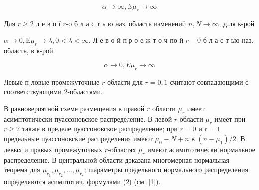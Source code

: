 \documentclass[10pt]{article}
\begin{document}
\[

\alpha \rightarrow \infty, E \mu_{r} \rightarrow \infty

\]



Для $r \geqslant 2$ л е в о ї $r$-о б л а с т ь ю наз. область изменений $n, N \rightarrow \infty$, д.ля к-рой



$\alpha \longrightarrow 0, \mathrm{E} \mu_{r} \longrightarrow \lambda, 0<\lambda<\infty$. Л е в о й п р о е ж т о ч по й $r-0$ б л а с т ью наз. область, в к-рой



\[

\alpha \longrightarrow 0, E \mu_{r} \longrightarrow \infty

\]



Левые п лөвые промежуточные $r$-области для $r=0,1$ считают совпадающими с соответствующими 2-областями.



В равновероятной схеме размещения в правой $r$ области $\mu_{r}$ имеет асимптотически пуассоновское распределение. В левой $r$-области $\mu_{r}$ имеет при $r \geqslant 2$ также в пределе пуассоновское распределение; при $r=0$ и $r=1$ предельные пуассоновские распределения имеют $\mu_{0}-N+n$ в $\left(n-\mu_{1}\right) / 2$. В левых и правых промежуточвых $r$-областях $\mu_{r}$ имеют асимптотически нормальное распределение. В центральной области доказана многомерная нормальная теорема для $\mu_{r_{1}}, \mu_{r_{2}}, \ldots, \mu_{r_{s}}$; шараметры предельного нормального распределения определяются асимптотич. формулами (2) (см. [1]).
\end{document}
